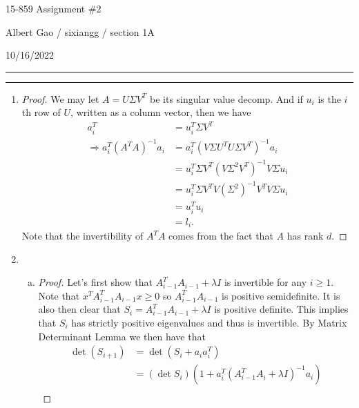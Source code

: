 \documentclass[11pt]{article}
\newcommand{\question}[1] {\vspace{.3in} \hrule\vspace{0.3em}
\noindent{\bf #1} \vspace{0.7em}
\hrule \vspace{.10in}}
\newcommand{\myinfo}{Albert Gao / sixiangg}
\newcommand{\myhwnum}{2}
\newcommand{\currdate}{10/16/2022}
\begin{document}
\bigskip                        %

\thispagestyle{plain}
\begin{center}                  %
{\Huge 15-859 Assignment \#\myhwnum}

\vspace{0.3cm}

\large{\myinfo { / section 1A}}

\large{\currdate}

\end{center}

\question{Task 1}
\begin{enumerate}[1.]
\item \begin{proof}
We may let $A = U\Sigma V^T$ be its singular value decomp. And if $u_i$ is the $i$th row of $U$, written as a column vector, then we have
\begin{align*}
  a_i^T &= u_i^T\Sigma V^T\\
  \Rightarrow a_i^T (A^T A)^{-1}a_i &= a_i^T (V \Sigma U^T U \Sigma V^T)^{-1} a_i\\
  &= u_i^T \Sigma V^T (V \Sigma^2 V^T)^{-1} V \Sigma u_i\\
  &= u_i^T \Sigma V^T V (\Sigma^2)^{-1} V^T V \Sigma u_i\\
  &= u_i^T u_i\\
  &= l_i.
\end{align*}
Note that the invertibility of $A^TA$ comes from the fact that $A$ has rank $d$.
\end{proof}
\item \begin{enumerate}[(a)]
\item \begin{proof}
Let's first show that $A^T_{i-1}A_{i-1} + \lambda I$ is invertible for any $i \ge 1$. Note that $x^TA^T_{i-1}A_{i-1}x \ge 0$ so $A^T_{i-1}A_{i-1}$ is positive semidefinite. It is also then clear that $S_i = A^T_{i-1}A_{i-1} + \lambda I$ is positive definite. This implies that $S_i$ has strictly positive eigenvalues and thus is invertible. By Matrix Determinant Lemma we then have that
\begin{align*}
  \det(S_{i+1}) &= 
  \det(S_i + a_i a_i^T)\\ &= (\det S_i)(1 + a_i^T(A^T_{i-1} A_{i} + \lambda I)^{-1} a_i) \\

\end{align*}
\end{proof}
\end{enumerate}
\end{enumerate}
\end{document}
